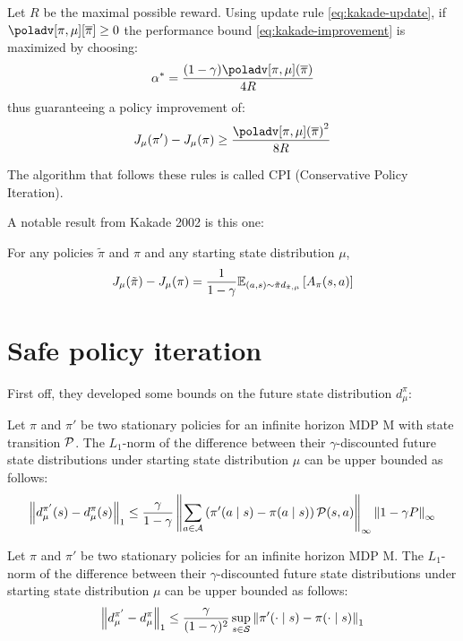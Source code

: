 \begin{theorem}
Let $R$ be the maximal possible reward. Using update rule \ref{eq:kakade-update}, if $\poladv[\pi, \mu][\overline{\pi}] \geq 0$ the performance bound \ref{eq:kakade-improvement} is maximized by choosing:
\begin{equation}
\alpha^* = \frac{(1-\gamma)\poladv[\pi, \mu](\overline{\pi})}{4R}
\end{equation}
thus guaranteeing a policy improvement of:
\begin{equation}
J_{\mu}(\pi') - J_{\mu}(\pi) \geq \frac{{\poladv[\pi, \mu](\overline{\pi})}^2}{8R}
\end{equation}
\end{theorem}

The algorithm that follows these rules is called CPI (Conservative Policy Iteration).

A notable result from Kakade 2002 is this one: 
\begin{theorem}
For any policies $\tilde{\pi}$ and $\pi$ and any starting state distribution $\mu$,
\begin{equation}
J_{\mu}(\tilde{\pi}) - J_{\mu}(\pi) = \frac{1}{1-\gamma}\EV[(a,s)\sim\tilde{\pi}d_{\tilde{\pi}, \mu}]{A_{\pi}(s,a)} \label{eq:kakade-lemma6.1}
\end{equation} 
\end{theorem}

\section{Safe policy iteration}
First off, they developed some bounds on the future state distribution $d_{\mu}^{\pi}$:
\begin{theorem}
Let $\pi$ and $\pi'$ be two stationary policies for an infinite horizon MDP M with state transition $\tfunc$. The $L_1$-norm of the difference between their $\gamma$-discounted future state distributions under starting state distribution $\mu$ can be upper bounded as follows:
\begin{equation}
\norm{d_{\mu}^{\pi'}(s) - d_{\mu}^{\pi}(s)} \leq \frac{\gamma}{1-\gamma}\norm[\infty]{\sum_{a\in\aspace}\left(\pi'(a\mid s) - \pi(a\mid s)\right)\tfunc(s,a)}\norm[\infty]{1-\gamma P}
\end{equation}
\end{theorem}


\begin{theorem}
Let $\pi$ and $\pi'$ be two stationary policies for an infinite horizon MDP M. The $L_1$-norm of the difference between their $\gamma$-discounted future state distributions under starting state distribution $\mu$ can be upper bounded as follows:
\begin{equation}
\norm{d_{\mu}^{\pi'} - d_{\mu}^{\pi}} \leq \frac{\gamma}{(1-\gamma)^2}\sup_{s\in\sspace}\norm{\pi'(\cdot\mid s) - \pi(\cdot \mid s)}
\end{equation}
\end{theorem}

